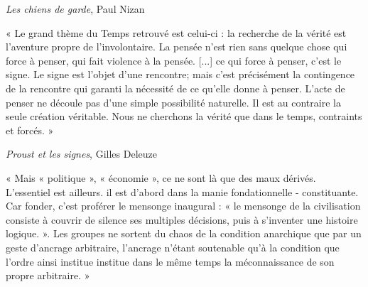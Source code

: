 \documentclass{article}
\begin{document}
\begin{flushright}\textit{Les chiens de garde}, Paul Nizan\end{flushright}
\vspace{6pt}
\begin{center} « Le grand thème du Temps retrouvé est celui-ci : la recherche de la vérité est l’aventure propre de l’involontaire. La pensée n’est rien sans quelque chose qui force à penser, qui fait violence à la pensée. [...] ce qui force à penser, c’est le signe. Le signe est l’objet d’une rencontre; mais c’est précisément la contingence de la rencontre qui garanti la nécessité de ce qu’elle donne à penser. L’acte de penser ne découle pas d’une simple possibilité naturelle. Il est au contraire la seule création véritable. Nous ne cherchons la vérité que dans le temps, contraints et forcés. » \end{center} 

\begin{flushright}\textit{Proust et les signes}, Gilles Deleuze\end{flushright}
\vspace{6pt}
\begin{center} « Mais « politique », « économie », ce ne sont là que des maux dérivés. L’essentiel est ailleurs. il est d’abord dans la manie fondationnelle - constituante. Car fonder, c’est proférer le mensonge inaugural : « le mensonge de la civilisation consiste à couvrir de silence ses multiples décisions, puis à s’inventer une histoire logique. ». Les groupes ne sortent du chaos de la condition anarchique que par un geste d’ancrage arbitraire, l’ancrage n’étant soutenable qu’à la condition que l’ordre ainsi institue institue dans le même temps la méconnaissance de son propre arbitraire. » \end{center}
\end{document}
